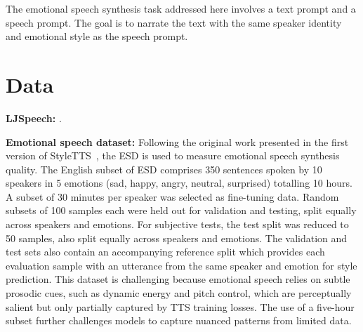 The emotional speech synthesis task addressed here involves a text prompt and a speech prompt. The goal is to narrate the text with the same speaker identity and emotional style as the speech prompt.


\section{Data}

\textbf{LJSpeech:} \citep{LJSpeechDataset}.

\textbf{Emotional speech dataset:} Following the original work presented in the first version of StyleTTS~\citep{li2025styletts}, the \ac{ESD} \citep{zhou2021emospeechdata} is used to measure emotional speech synthesis quality. The English subset of \ac{ESD} comprises 350 sentences spoken by 10 speakers in 5 emotions (sad, happy, angry, neutral, surprised) totalling 10 hours. A subset of 30 minutes per speaker was selected as fine-tuning data. Random subsets of 100 samples each were held out for validation and testing, split equally across speakers and emotions. For subjective tests, the test split was reduced to 50 samples, also split equally across speakers and emotions. The validation and test sets also contain an accompanying reference split which provides each evaluation sample with an utterance from the same speaker and emotion for style prediction. This dataset is challenging because emotional speech relies on subtle prosodic cues, such as dynamic energy and pitch control, which are perceptually salient \citep{larrouy2025emoprosody} but only partially captured by \ac{TTS} training losses. The use of a five-hour subset further challenges models to capture nuanced patterns from limited data.



